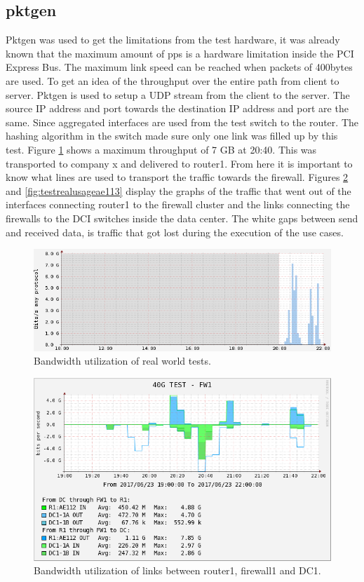 \subsection{pktgen}
Pktgen was used to get the limitations from the test hardware, it was already known that the maximum amount of pps is a hardware limitation inside the PCI Express Bus. 
The maximum link speed can be reached when packets of 400bytes are used. To get an idea of the throughput over the entire path from client to server. Pktgen is used to setup a UDP stream from the client to the server. 
The source IP address and port towards the destination IP address and port are the same. Since aggregated interfaces are used from the test switch to the router. The hashing algorithm in the switch made sure only one link was filled up by this test. 
Figure \ref{fig:surftest} shows a maximum throughput of 7 GB at 20:40. This was transported to company x and delivered to router1. From here it is important to know what lines are used to transport the traffic towards the firewall.
Figures \ref{fig:testrealusageae112} and \ref{fig:testrealusageae113} display the graphs of the traffic that went out of the interfaces connecting router1 to the firewall cluster and the links connecting the firewalls to the DCI switches inside the data center. The white gaps between send and received data, is traffic that got lost during the execution of the use cases.
   
\begin{figure}
  \includegraphics[scale=0.6]{images/test-link-usage.png}
  \caption{Bandwidth utilization of real world tests.}
  \label{fig:surftest}
\end{figure}

\begin{figure}
  \includegraphics[scale=0.6]{images/real-ae112.png}
  \caption{Bandwidth utilization of links between router1, firewall1 and DC1.}
  \label{fig:testrealusageae112}
\end{figure}

